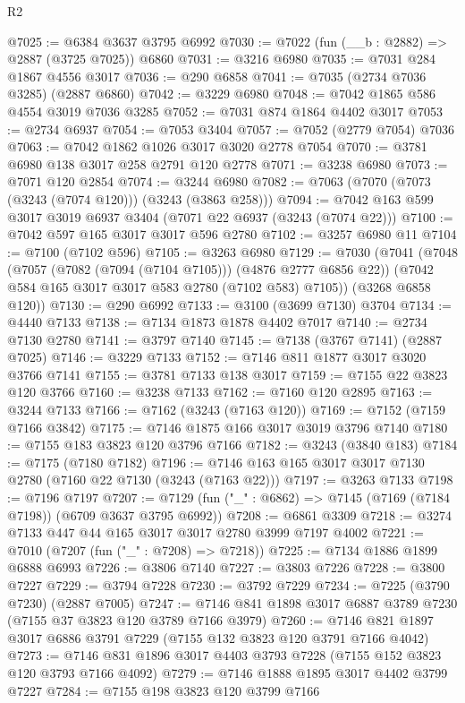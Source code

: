 \begin{lexlean}{R2}
\begin{coremodule}
@7025 := @6384 @3637 @3795 @6992
@7030 := @7022 (fun (__b : @2882) => @2887 (@3725 @7025)) @6860
@7031 := @3216 @6980
@7035 := @7031 @284 @1867 @4556 @3017
@7036 := @290 @6858
@7041 := @7035 (@2734 @7036 @3285) (@2887 @6860)
@7042 := @3229 @6980
@7048 := @7042 @1865 @586 @4554 @3019 @7036 @3285
@7052 := @7031 @874 @1864 @4402 @3017
@7053 := @2734 @6937
@7054 := @7053 @3404
@7057 := @7052 (@2779 @7054) @7036
@7063 := @7042 @1862 @1026 @3017 @3020 @2778 @7054
@7070 := @3781 @6980 @138 @3017 @258 @2791 @120 @2778
@7071 := @3238 @6980
@7073 := @7071 @120 @2854
@7074 := @3244 @6980
@7082 := @7063 (@7070 (@7073 (@3243 (@7074 @120))) (@3243 (@3863 @258)))
@7094 := @7042 @163 @599 @3017 @3019 @6937 @3404 (@7071 @22 @6937 (@3243 (@7074 @22)))
@7100 := @7042 @597 @165 @3017 @3017 @596 @2780
@7102 := @3257 @6980 @11
@7104 := @7100 (@7102 @596)
@7105 := @3263 @6980
@7129 := @7030
    (@7041
      (@7048
        (@7057 (@7082 (@7094 (@7104 @7105))) (@4876 @2777 @6856 @22))
        (@7042 @584 @165 @3017 @3017 @583 @2780 (@7102 @583) @7105))
      (@3268 @6858 @120))
@7130 := @290 @6992
@7133 := @3100 (@3699 @7130) @3704
@7134 := @4440 @7133
@7138 := @7134 @1873 @1878 @4402 @7017
@7140 := @2734 @7130 @2780
@7141 := @3797 @7140
@7145 := @7138 (@3767 @7141) (@2887 @7025)
@7146 := @3229 @7133
@7152 := @7146 @811 @1877 @3017 @3020 @3766 @7141
@7155 := @3781 @7133 @138 @3017
@7159 := @7155 @22 @3823 @120 @3766
@7160 := @3238 @7133
@7162 := @7160 @120 @2895
@7163 := @3244 @7133
@7166 := @7162 (@3243 (@7163 @120))
@7169 := @7152 (@7159 @7166 @3842)
@7175 := @7146 @1875 @166 @3017 @3019 @3796 @7140
@7180 := @7155 @183 @3823 @120 @3796 @7166
@7182 := @3243 (@3840 @183)
@7184 := @7175 (@7180 @7182)
@7196 := @7146 @163 @165 @3017 @3017 @7130 @2780 (@7160 @22 @7130 (@3243 (@7163 @22)))
@7197 := @3263 @7133
@7198 := @7196 @7197
@7207 := @7129 (fun ("_" : @6862) => @7145 (@7169 (@7184 @7198)) (@6709 @3637 @3795 @6992))
@7208 := @6861 @3309
@7218 := @3274 @7133 @447 @44 @165 @3017 @3017 @2780 @3999 @7197 @4002
@7221 := @7010 (@7207 (fun ("_" : @7208) => @7218))
@7225 := @7134 @1886 @1899 @6888 @6993
@7226 := @3806 @7140
@7227 := @3803 @7226
@7228 := @3800 @7227
@7229 := @3794 @7228
@7230 := @3792 @7229
@7234 := @7225 (@3790 @7230) (@2887 @7005)
@7247 := @7146 @841 @1898 @3017 @6887 @3789 @7230 (@7155 @37 @3823 @120 @3789 @7166 @3979)
@7260 := @7146 @821 @1897 @3017 @6886 @3791 @7229 (@7155 @132 @3823 @120 @3791 @7166 @4042)
@7273 := @7146 @831 @1896 @3017 @4403 @3793 @7228 (@7155 @152 @3823 @120 @3793 @7166 @4092)
@7279 := @7146 @1888 @1895 @3017 @4402 @3799 @7227
@7284 := @7155 @198 @3823 @120 @3799 @7166

\end{coremodule}
\end{lexlean}
